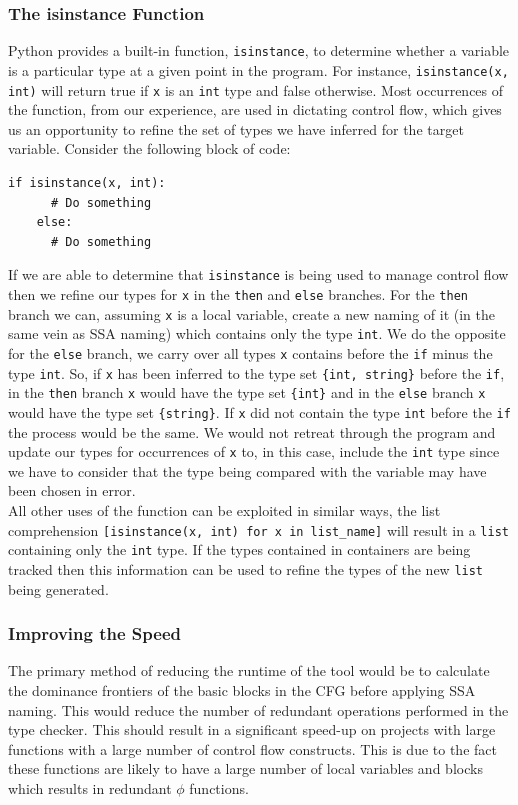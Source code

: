 \documentclass[12pt, titlepage]{article}
\begin{document}
\subsubsection*{The isinstance Function}
Python provides a built-in function, \texttt{isinstance}, to determine whether a variable is a particular type at a given point in the program. For instance, \texttt{isinstance(x, int)} will return true if \texttt{x} is an \texttt{int} type and false otherwise. Most occurrences of the function, from our experience, are used in dictating control flow, which gives us an opportunity to refine the set of types we have inferred for the target variable. Consider the following block of code:
\begin{lstlisting}[mathescape]
    if isinstance(x, int):
      # Do something
    else:
      # Do something
\end{lstlisting}
If we are able to determine that \texttt{isinstance} is being used to manage control flow then we refine our types for \texttt{x} in the \texttt{then} and \texttt{else} branches. For the \texttt{then} branch we can, assuming \texttt{x} is a local variable, create a new naming of it (in the same vein as SSA naming) which contains only the type \texttt{int}. We do the opposite for the \texttt{else} branch, we carry over all types \texttt{x} contains before the \texttt{if} minus the type \texttt{int}. So, if \texttt{x} has been inferred to the type set \texttt{\{int, string\}} before the \texttt{if}, in the \texttt{then} branch \texttt{x} would have the type set \texttt{\{int\}} and in the \texttt{else} branch \texttt{x} would have the type set \texttt{\{string\}}. If \texttt{x} did not contain the type \texttt{int} before the \texttt{if} the process would be the same. We would not retreat through the program and update our types for occurrences of \texttt{x} to, in this case, include the \texttt{int} type since we have to consider that the type being compared with the variable may have been chosen in error. \\
\indent All other uses of the function can be exploited in similar ways, the list comprehension \texttt{[isinstance(x, int) for x in list\_name]} will result in a \texttt{list} containing only the \texttt{int} type. If the types contained in containers are being tracked then this information can be used to refine the types of the new \texttt{list} being generated.

\subsubsection*{Improving the Speed}
The primary method of reducing the runtime of the tool would be to calculate the dominance frontiers of the basic blocks in the CFG before applying SSA naming. This would reduce the number of redundant operations performed in the type checker. This should result in a significant speed-up on projects with large functions with a large number of control flow constructs. This is due to the fact these functions are likely to have a large number of local variables and blocks which results in redundant $\phi$ functions.
\end{document}
